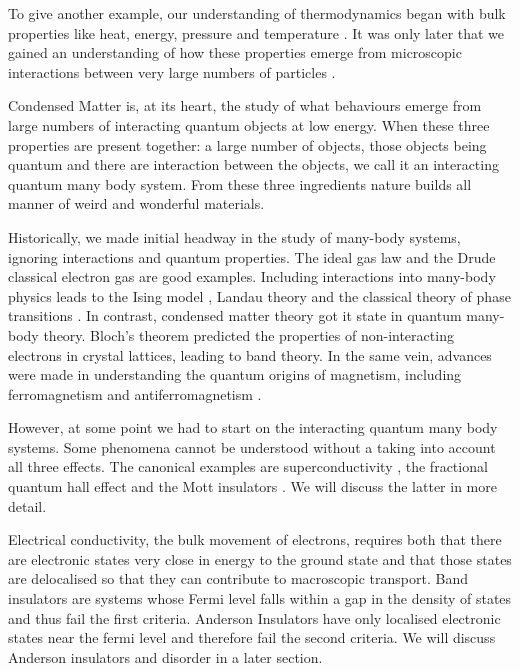 To give another example, our understanding of thermodynamics began with bulk properties like heat, energy, pressure and temperature \autocite{saslowHistoryThermodynamicsMissing2020}. It was only later that we gained an understanding of how these properties emerge from microscopic interactions between very large numbers of particles \autocite{flammHistoryOutlookStatistical1998}.

Condensed Matter is, at its heart, the study of what behaviours emerge from large numbers of interacting quantum objects at low energy. When these three properties are present together: a large number of objects, those objects being quantum and there are interaction between the objects, we call it an interacting quantum many body system. From these three ingredients nature builds all manner of weird and wonderful materials.

Historically, we made initial headway in the study of many-body systems, ignoring interactions and quantum properties. The ideal gas law and the Drude classical electron gas \autocite{ashcroftSolidStatePhysics1976} are good examples. Including interactions into many-body physics leads to the Ising model \autocite{isingBeitragZurTheorie1925}, Landau theory \autocite{landau2013fluid} and the classical theory of phase transitions \autocite{jaegerEhrenfestClassificationPhase1998}. In contrast, condensed matter theory got it state in quantum many-body theory. Bloch's theorem \autocite{blochÜberQuantenmechanikElektronen1929} predicted the properties of non-interacting electrons in crystal lattices, leading to band theory. In the same vein, advances were made in understanding the quantum origins of magnetism, including ferromagnetism and antiferromagnetism \autocite{MagnetismCondensedMatter}.

However, at some point we had to start on the interacting quantum many body systems. Some phenomena cannot be understood without a taking into account all three effects. The canonical examples are superconductivity \autocite{MicroscopicTheorySuperconductivity}, the fractional quantum hall effect \autocite{feldmanFractionalChargeFractional2021} and the Mott insulators \autocite{mottBasisElectronTheory1949,fisherMottInsulatorsSpin1999}. We will discuss the latter in more detail.

Electrical conductivity, the bulk movement of electrons, requires both that there are electronic states very close in energy to the ground state and that those states are delocalised so that they can contribute to macroscopic transport. Band insulators are systems whose Fermi level falls within a gap in the density of states and thus fail the first criteria. Anderson Insulators have only localised electronic states near the fermi level and therefore fail the second criteria. We will discuss Anderson insulators and disorder in a later section.


